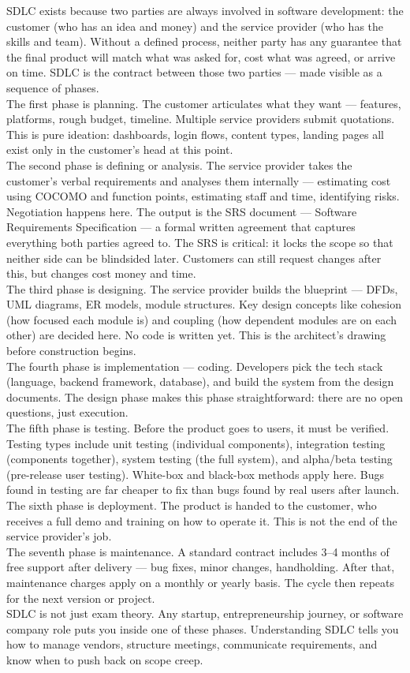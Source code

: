 \documentclass{report}
\begin{document}
SDLC exists because two parties are always involved in software development: the customer (who has an idea and money) and the service provider (who has the skills and team). Without a defined process, neither party has any guarantee that the final product will match what was asked for, cost what was agreed, or arrive on time. SDLC is the contract between those two parties — made visible as a sequence of phases.\\
The first phase is planning. The customer articulates what they want — features, platforms, rough budget, timeline. Multiple service providers submit quotations. This is pure ideation: dashboards, login flows, content types, landing pages all exist only in the customer's head at this point.\\
The second phase is defining or analysis. The service provider takes the customer's verbal requirements and analyses them internally — estimating cost using COCOMO and function points, estimating staff and time, identifying risks. Negotiation happens here. The output is the SRS document — Software Requirements Specification — a formal written agreement that captures everything both parties agreed to. The SRS is critical: it locks the scope so that neither side can be blindsided later. Customers can still request changes after this, but changes cost money and time.\\
The third phase is designing. The service provider builds the blueprint — DFDs, UML diagrams, ER models, module structures. Key design concepts like cohesion (how focused each module is) and coupling (how dependent modules are on each other) are decided here. No code is written yet. This is the architect's drawing before construction begins.\\
The fourth phase is implementation — coding. Developers pick the tech stack (language, backend framework, database), and build the system from the design documents. The design phase makes this phase straightforward: there are no open questions, just execution.\\
The fifth phase is testing. Before the product goes to users, it must be verified. Testing types include unit testing (individual components), integration testing (components together), system testing (the full system), and alpha/beta testing (pre-release user testing). White-box and black-box methods apply here. Bugs found in testing are far cheaper to fix than bugs found by real users after launch.\\
The sixth phase is deployment. The product is handed to the customer, who receives a full demo and training on how to operate it. This is not the end of the service provider's job.\\
The seventh phase is maintenance. A standard contract includes 3–4 months of free support after delivery — bug fixes, minor changes, handholding. After that, maintenance charges apply on a monthly or yearly basis. The cycle then repeats for the next version or project.\\
SDLC is not just exam theory. Any startup, entrepreneurship journey, or software company role puts you inside one of these phases. Understanding SDLC tells you how to manage vendors, structure meetings, communicate requirements, and know when to push back on scope creep.
\end{document}
